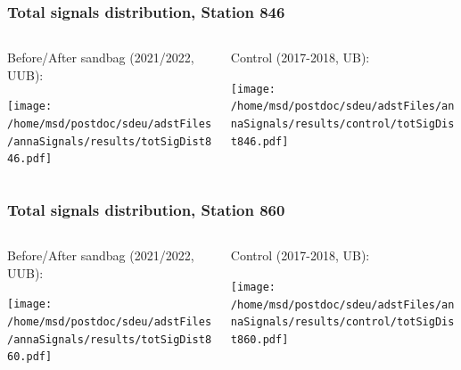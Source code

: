 \documentclass[aspectratio=169]{beamer}
\begin{document}
\begin{frame}
  \frametitle{Total signals distribution, Station 846}
  
  \begin{columns}[T,c]
    \begin{column}{.5\textwidth}
      Before/After sandbag (2021/2022, UUB):
      \vspace{.3cm}

      \texttt{[image: /home/msd/postdoc/sdeu/adstFiles/annaSignals/results/totSigDist846.pdf]}
    \end{column}
    \begin{column}{.5\textwidth}
      Control (2017-2018, UB):
      \vspace{0.3cm}

      \texttt{[image: /home/msd/postdoc/sdeu/adstFiles/annaSignals/results/control/totSigDist846.pdf]}
    \end{column}    
\end{columns}
\end{frame}

\begin{frame}
  \frametitle{Total signals distribution, Station 860}
  
  \begin{columns}[T,c]
    \begin{column}{.5\textwidth}
      Before/After sandbag (2021/2022, UUB):
      \vspace{.3cm}

      \texttt{[image: /home/msd/postdoc/sdeu/adstFiles/annaSignals/results/totSigDist860.pdf]}
    \end{column}
    \begin{column}{.5\textwidth}
      Control (2017-2018, UB):
      \vspace{0.3cm}

      \texttt{[image: /home/msd/postdoc/sdeu/adstFiles/annaSignals/results/control/totSigDist860.pdf]}
    \end{column}    
\end{columns}
\end{frame}
\end{document}
